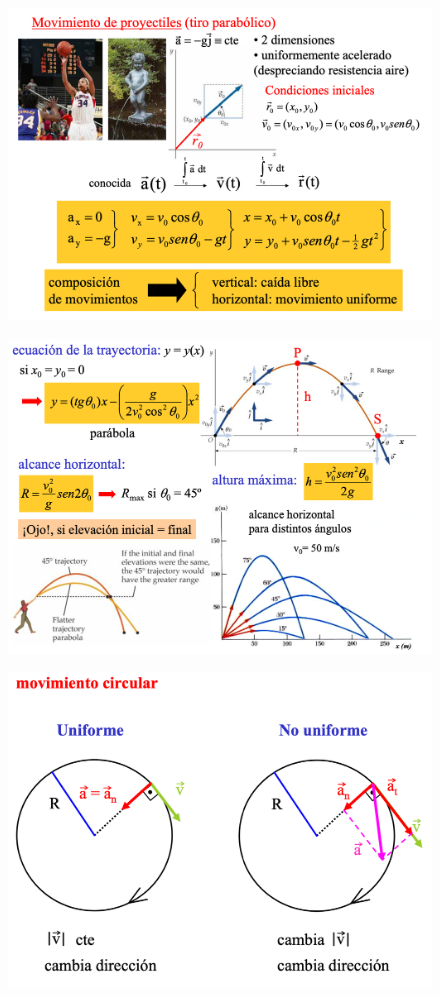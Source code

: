 \newpage %
	\begin{figure}[H]
		\centering
		\includegraphics[width=.95\textwidth]{imagenes/imagenes02/T02IM22.png}
		\end{figure}		
	\begin{figure}[H]
		\centering
		\includegraphics[width=.95\textwidth]{imagenes/imagenes02/T02IM23.png}
		\end{figure}
	\begin{figure}[H]
		\centering
		\includegraphics[width=.6\textwidth]{imagenes/imagenes02/T02IM29.png}
		\end{figure}
